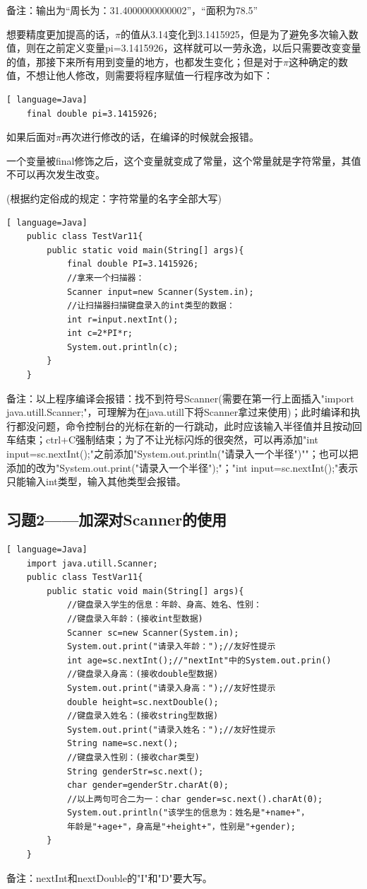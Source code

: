 \documentclass{article}
\begin{document}
	备注：输出为“周长为：31.4000000000002”，“面积为78.5”
	
	想要精度更加提高的话，$\pi$的值从3.14变化到3.1415925，但是为了避免多次输入数值，则在之前定义变量pi=3.1415926，这样就可以一劳永逸，以后只需要改变变量的值，那接下来所有用到变量的地方，也都发生变化；但是对于$\pi$这种确定的数值，不想让他人修改，则需要将程序赋值一行程序改为如下：
	
	\begin{lstlisting}[ language=Java]
	final double pi=3.1415926;	
	\end{lstlisting}
	
	如果后面对$\pi$再次进行修改的话，在编译的时候就会报错。
	
	一个变量被final修饰之后，这个变量就变成了常量，这个常量就是字符常量，其值不可以再次发生改变。
	
	(根据约定俗成的规定：字符常量的名字全部大写)
	
	\begin{lstlisting}[ language=Java]
	public class TestVar11{
		public static void main(String[] args){
			final double PI=3.1415926;
			//拿来一个扫描器：
			Scanner input=new Scanner(System.in);
			//让扫描器扫描键盘录入的int类型的数据：
			int r=input.nextInt();
			int c=2*PI*r;
			System.out.println(c);
		}
	}
	\end{lstlisting}
	
	备注：以上程序编译会报错：找不到符号Scanner(需要在第一行上面插入"import java.utill.Scanner;"，可理解为在java.utill下将Scanner拿过来使用)；此时编译和执行都没问题，命令控制台的光标在新的一行跳动，此时应该输入半径值并且按动回车结束；ctrl+C强制结束；为了不让光标闪烁的很突然，可以再添加"int input=sc.nextInt();"之前添加"System.out.println("请录入一个半径")""；也可以把添加的改为"System.out.print("请录入一个半径");"；"int input=sc.nextInt();"表示只能输入int类型，输入其他类型会报错。
	
	\subsection{习题2——加深对Scanner的使用} 
	
	\begin{lstlisting}[ language=Java]
	import java.utill.Scanner;
	public class TestVar11{
		public static void main(String[] args){
			//键盘录入学生的信息：年龄、身高、姓名、性别：
			//键盘录入年龄：(接收int型数据)
			Scanner sc=new Scanner(System.in);
			System.out.print("请录入年龄：");//友好性提示
			int age=sc.nextInt();//"nextInt"中的System.out.prin()
			//键盘录入身高：(接收double型数据)
			System.out.print("请录入身高：");//友好性提示
			double height=sc.nextDouble();
			//键盘录入姓名：(接收string型数据)
			System.out.print("请录入姓名：");//友好性提示
			String name=sc.next();
			//键盘录入性别：(接收char类型)
			String genderStr=sc.next();
			char gender=genderStr.charAt(0);
			//以上两句可合二为一：char gender=sc.next().charAt(0);
			System.out.println("该学生的信息为：姓名是"+name+"，
			年龄是"+age+"，身高是"+height+"，性别是"+gender);
		}
	}
	\end{lstlisting}
	
	备注：nextInt和nextDouble的"I"和"D"要大写。
	
	
	
	
\end{document}
